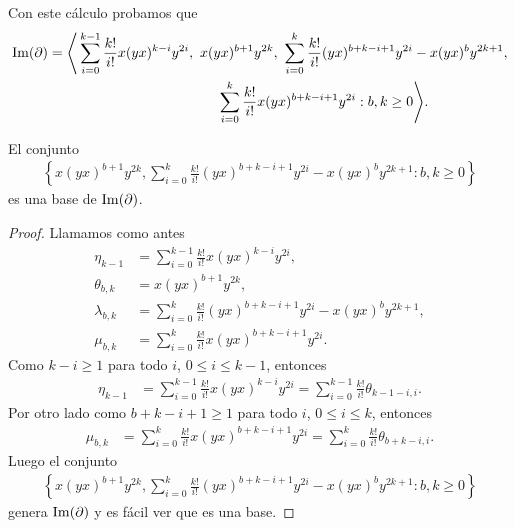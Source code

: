 \documentclass[fleqn,../tesis.tex]{subfiles}
\begin{document}
Con este cálculo probamos que
\begin{align*}
	\Ima(\partial) = \Bigg\langle & \sum_{i = 0}^{k - 1}\frac{k!}{i!}x(yx)^{k - i}y^{2i},
		\ x(yx)^{b + 1}y^{2k},
		\ \sum_{i = 0}^k\frac{k!}{i!}(yx)^{b + k - i + 1}y^{2i} - x(yx)^by^{2k + 1}, \\
		&\hspace{100pt}\sum_{i = 0}^k\frac{k!}{i!}x(yx)^{b + k - i + 1}y^{2i} : b,k \geq 0 \Bigg\rangle.
\end{align*}
\begin{prop}
\label{impartial}
El conjunto
\begin{align*}
		\left\{ x(yx)^{b + 1}y^{2k},
			\sum_{i = 0}^k\frac{k!}{i!}(yx)^{b + k - i + 1}y^{2i} - x(yx)^by^{2k + 1} :b, k \geq 0 \right\}
\end{align*}
es una base de $\operatorname{Im}(\partial)$.
\end{prop}
\begin{proof}
Llamamos como antes
\begin{align*}
	\eta_{k - 1} &=  \sum_{i = 0}^{k-1}\frac{k!}{i!}x(yx)^{k - i}y^{2i}, \\
	\theta_{b,k} &= x(yx)^{b + 1}y^{2k},\\
	\lambda_{b,k} &= \sum_{i = 0}^k\frac{k!}{i!}(yx)^{b + k - i + 1}y^{2i} - x(yx)^by^{2k + 1}, \\
	\mu_{b,k} &= \sum_{i = 0}^k\frac{k!}{i!}x(yx)^{b + k - i + 1}y^{2i}.
\end{align*}
Como $k - i \geq 1$ para todo $i$,  $0 \leq i \leq k -1$, entonces
\begin{align*}
	\eta_{k - 1} &= \sum_{i = 0}^{k-1}\frac{k!}{i!}x(yx)^{k - i}y^{2i}
		= \sum_{i = 0}^{k-1}\frac{k!}{i!}\theta_{k - 1 - i,i}.
\end{align*}
Por otro lado como $b + k - i + 1 \geq 1$ para todo $i$, $0 \leq i \leq k$, entonces
\begin{align*}
	\mu_{b,k} &= \sum_{i = 0}^k\frac{k!}{i!}x(yx)^{b + k - i + 1}y^{2i}
		= \sum_{i = 0}^k\frac{k!}{i!}\theta_{b + k - i, i}.
\end{align*}
Luego el conjunto
\begin{align*}
	\left\{ x(yx)^{b + 1}y^{2k},
		\sum_{i = 0}^k\frac{k!}{i!}(yx)^{b + k - i + 1}y^{2i} - x(yx)^by^{2k + 1} :b,k \geq 0	\right\}
\end{align*}
 genera $\operatorname{Im}(\partial)$ y es fácil ver que es una base.
\end{proof}
\end{document}
